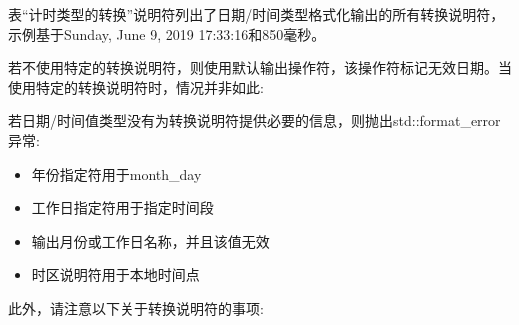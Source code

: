表“计时类型的转换”说明符列出了日期/时间类型格式化输出的所有转换说明符，示例基于Sunday, June 9, 2019 17:33:16和850毫秒。

若不使用特定的转换说明符，则使用默认输出操作符，该操作符标记无效日期。当使用特定的转换说明符时，情况并非如此:


若日期/时间值类型没有为转换说明符提供必要的信息，则抛出std::format\_error异常:

\begin{itemize}
\item 
年份指定符用于month\_day

\item 
工作日指定符用于指定时间段

\item 
输出月份或工作日名称，并且该值无效

\item 
时区说明符用于本地时间点
\end{itemize}

此外，请注意以下关于转换说明符的事项:

